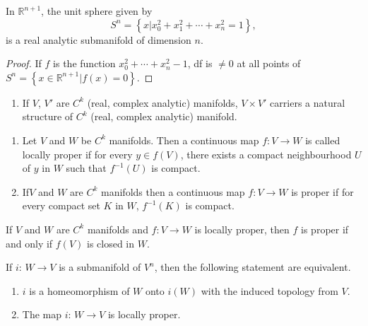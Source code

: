 \begin{coro*}
  In $\mathbb{R}^{n+1}$, the unit sphere given by 
  $$
  S^n =  \left\{ x \bigg| x^2_0 + x^2_1 + \cdots + x^2_n = 1 \right\},
  $$
  is a real  analytic submanifold of dimension $n$.
\end{coro*} 

\begin{proof}
  If $f$ is the function $x^2_0 + \cdots +  x^2_n -1$, df is $\neq 0$
  at all points of $S^n= \left\{ x \in \mathbb{R}^{n+1} \bigg|f(x) =
  0 \right\}$. 
\end{proof} 

\begin{enumerate}[4.]
\item If $V$, $V'$ are $C^k$ (real, complex analytic) manifolds, $V
  \times V'$ carriers a natural structure of $C^k$ (real, complex
  analytic) manifold. 
 \end{enumerate} 

\begin{defis*}
  \begin{enumerate}[1)]
  \item Let $V$ and $W$ be $C^k$ manifolds. Then a continuous map $f:V
    \to W$ is called locally proper if for every $y  \in  f(V)$, there
    exists a compact neighbourhood $U$ of $y$ in $W$ such that
    $f^{-1}(U)$ is compact. 

  \item If\pageoriginale $V$ and $W$ are $C^k$ manifolds then a continuous map $f: V
    \to W$ is proper if for every compact set $K$ in $W$, $f^{-1}(K)$ is
    compact. 
  \end{enumerate} 
\end{defis*} 

\begin{remark*}
  If $V$ and $W$ are $C^k$ manifolds and $f: V \to W$ is locally
  proper, then  $f$ is proper if and only if $f(V)$ is closed in $W$. 
\end{remark*}

\setcounter{proposition}{0}
\begin{proposition}\label{chap2:sec3:prop1} %
  If $i$: $W \to V$ is a submanifold of $V^n$, then  the following
  statement are equivalent. 
  \begin{enumerate}[1)]
  \item $i$ is a homeomorphism of $W$ onto $i(W)$ with the induced
    topology from $V$.  
  \item The map $i$: $W \to V$ is locally proper.
  \end{enumerate} 
\end{proposition} 


